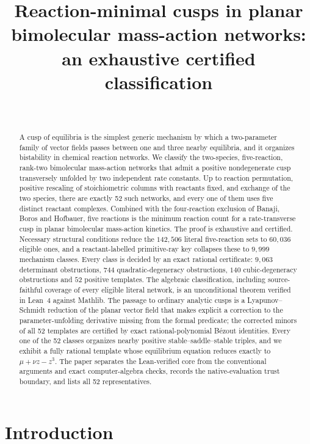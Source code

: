 \documentclass[11pt,a4paper]{article}
\title{Reaction-minimal cusps in planar bimolecular mass-action networks: an exhaustive certified classification}
\author{\PaperAuthor\\ \small \PaperAffiliation}
\date{\PaperDate}
\theoremstyle{plain}
\theoremstyle{definition}
\theoremstyle{remark}
\numberwithin{equation}{section}
\begin{document}
\maketitle

\begin{abstract}
A cusp of equilibria is the simplest generic mechanism by which a two-parameter family of vector fields passes between one and three nearby equilibria, and it organizes bistability in chemical reaction networks. We classify the two-species, five-reaction, rank-two bimolecular mass-action networks that admit a positive nondegenerate cusp transversely unfolded by two independent rate constants. Up to reaction permutation, positive rescaling of stoichiometric columns with reactants fixed, and exchange of the two species, there are exactly 52 such networks, and every one of them uses five distinct reactant complexes. Combined with the four-reaction exclusion of Banaji, Boros and Hofbauer, five reactions is the minimum reaction count for a rate-transverse cusp in planar bimolecular mass-action kinetics. The proof is exhaustive and certified. Necessary structural conditions reduce the $142{,}506$ literal five-reaction sets to $60{,}036$ eligible ones, and a reactant-labelled primitive-ray key collapses these to $9{,}999$ mechanism classes. Every class is decided by an exact rational certificate: $9{,}063$ determinant obstructions, $744$ quadratic-degeneracy obstructions, $140$ cubic-degeneracy obstructions and $52$ positive templates. The algebraic classification, including source-faithful coverage of every eligible literal network, is an unconditional theorem verified in Lean~4 against Mathlib. The passage to ordinary analytic cusps is a Lyapunov--Schmidt reduction of the planar vector field that makes explicit a correction to the parameter-unfolding derivative missing from the formal predicate; the corrected minors of all 52 templates are certified by exact rational-polynomial B\'ezout identities. Every one of the 52 classes organizes nearby positive stable--saddle--stable triples, and we exhibit a fully rational template whose equilibrium equation reduces exactly to $\mu+\nu z-z^{3}$. The paper separates the Lean-verified core from the conventional arguments and exact computer-algebra checks, records the native-evaluation trust boundary, and lists all 52 representatives.
\end{abstract}

\section{Introduction}\label{sec:intro}
\end{document}
